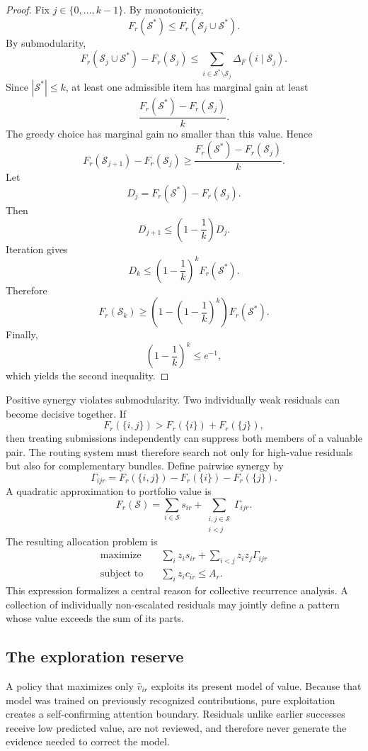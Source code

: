 \documentclass[11pt]{article}
\theoremstyle{definition}
\begin{document}
\begin{proof}
Fix \(j\in\{0,\dots,k-1\}\). By monotonicity,
\[
F_r(\mathcal{S}^{*})
\leq
F_r(\mathcal{S}_j\cup\mathcal{S}^{*}).
\]
By submodularity,
\[
F_r(\mathcal{S}_j\cup\mathcal{S}^{*})
-
F_r(\mathcal{S}_j)
\leq
\sum_{i\in\mathcal{S}^{*}\setminus\mathcal{S}_j}
\Delta_F(i\mid\mathcal{S}_j).
\]
Since \(|\mathcal{S}^{*}|\leq k\), at least one admissible item has marginal gain at least
\[
\frac{
F_r(\mathcal{S}^{*})-F_r(\mathcal{S}_j)
}{k}.
\]
The greedy choice has marginal gain no smaller than this value. Hence
\[
F_r(\mathcal{S}_{j+1})-F_r(\mathcal{S}_j)
\geq
\frac{
F_r(\mathcal{S}^{*})-F_r(\mathcal{S}_j)
}{k}.
\]
Let
\[
D_j
=
F_r(\mathcal{S}^{*})-F_r(\mathcal{S}_j).
\]
Then
\[
D_{j+1}
\leq
\left(1-\frac{1}{k}\right)D_j.
\]
Iteration gives
\[
D_k
\leq
\left(1-\frac{1}{k}\right)^k
F_r(\mathcal{S}^{*}).
\]
Therefore
\[
F_r(\mathcal{S}_k)
\geq
\left(
1-\left(1-\frac{1}{k}\right)^k
\right)
F_r(\mathcal{S}^{*}).
\]
Finally,
\[
\left(1-\frac{1}{k}\right)^k
\leq e^{-1},
\]
which yields the second inequality.
\end{proof}

Positive synergy violates submodularity. Two individually weak residuals can become decisive together. If
\[
F_r(\{i,j\})
>
F_r(\{i\})
+
F_r(\{j\}),
\]
then treating submissions independently can suppress both members of a valuable pair. The routing system must therefore search not only for high-value residuals but also for complementary bundles. Define pairwise synergy by
\[
\Gamma_{ijr}
=
F_r(\{i,j\})-F_r(\{i\})-F_r(\{j\}).
\]
A quadratic approximation to portfolio value is
\[
F_r(\mathcal{S})
=
\sum_{i\in\mathcal{S}}s_{ir}
+
\sum_{\substack{i,j\in\mathcal{S}\\i<j}}
\Gamma_{ijr}.
\]
The resulting allocation problem is
\[
\begin{aligned}
\text{maximize}\quad
&
\sum_i z_i s_{ir}
+
\sum_{i<j}z_i z_j\Gamma_{ijr}
\\
\text{subject to}\quad
&
\sum_i z_i c_{ir}\leq A_r.
\end{aligned}
\]
This expression formalizes a central reason for collective recurrence analysis. A collection of individually non-escalated residuals may jointly define a pattern whose value exceeds the sum of its parts.

\subsection{The exploration reserve}

A policy that maximizes only \(\widehat{v}_{ir}\) exploits its present model of value. Because that model was trained on previously recognized contributions, pure exploitation creates a self-confirming attention boundary. Residuals unlike earlier successes receive low predicted value, are not reviewed, and therefore never generate the evidence needed to correct the model.
\end{document}
